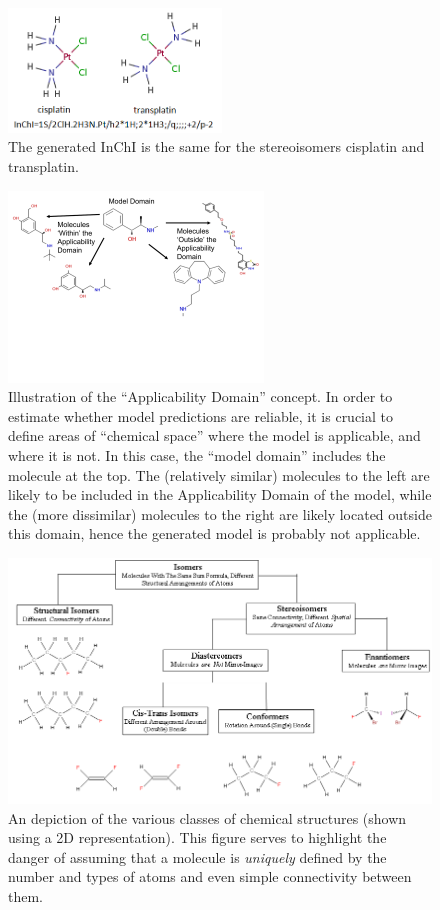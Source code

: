 \documentclass{../sig-alternate}
\begin{document}
\begin{figure}
\centering
\includegraphics[height=1.3in]{platins.png}
\caption{The generated InChI is the same for the stereoisomers cisplatin and transplatin.}
\label{figure:cistrans}
\end{figure}
%
\begin{figure}
\centering
\includegraphics[height=2in]{CACM_ApplicabilityDomain.pdf}
\caption{Illustration of the ``Applicability Domain'' concept. In order to estimate whether model predictions are reliable, it is crucial to define areas of ``chemical space'' where the model is applicable, and where it is not. In this case, the ``model domain'' includes the molecule at the top. The (relatively similar) molecules to the left are likely to be included in the Applicability Domain of the model, while the (more dissimilar) molecules to the right are likely located outside this domain, hence the generated model is probably not applicable.}
\label{figure:applicability-domain}
\end{figure}
%
\begin{figure}
\centering
\includegraphics[width=\linewidth]{cacm_tautomers.png}
\caption{An depiction of the various classes of chemical structures
  (shown using a 2D representation). This figure serves to highlight
  the danger of assuming that a molecule is \emph{uniquely} defined by
the number and types of atoms and even simple connectivity between them.}
\label{fig:structure-classes}
\end{figure}
%
\end{document}
